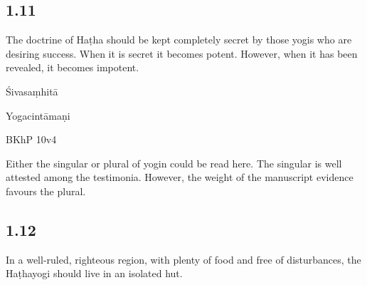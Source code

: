 \begin{ekdosis}
\subsection*{1.11}
\begin{translation}[hp01_011]
The doctrine of Haṭha should be kept completely secret by those yogis who are desiring success. When it is secret it becomes potent. However, when it has been revealed, it becomes impotent.
\end{translation}

\begin{sources}[hp01_011]
Śivasaṃhitā

\begin{versinnote}
\end{versinnote}

\end{sources}

\begin{testimonia}[hp01_011]
Yogacintāmaṇi

\begin{versinnote}
\end{versinnote}

BKhP 10v4
\end{testimonia}

\begin{philcomm}[hp01_011]        
Either the singular or plural of yogin could be read here. The singular is well attested among the testimonia. However, the weight of the manuscript evidence favours the plural.  
\end{philcomm}

\subsection*{1.12}
\begin{translation}[hp01_012]
In a well-ruled, righteous region, with plenty of food and free of disturbances, the Haṭhayogi should live in an isolated hut.
\end{translation}


\end{ekdosis}

